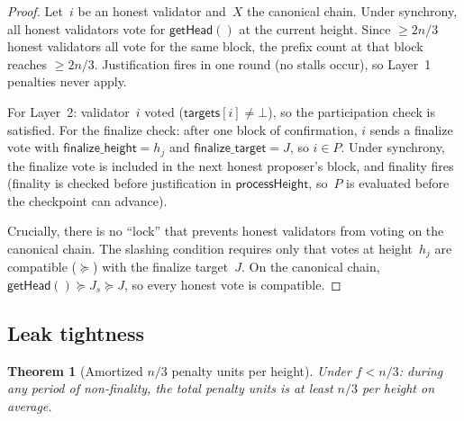 \documentclass{article}
\newcommand{\targets}{\mathsf{targets}}
\newcommand{\finalizetarget}{\mathsf{finalize\_target}}
\newcommand{\finalizeheight}{\mathsf{finalize\_height}}
\theoremstyle{plain}
\newtheorem{theorem}{Theorem}
\theoremstyle{definition}
\theoremstyle{remark}
\begin{document}
\begin{proof}
Let~$i$ be an honest validator and~$X$ the canonical chain.
Under synchrony, all honest validators vote for $\textsf{getHead}()$ at the current height.
Since $\geq 2n/3$ honest validators all vote for the same block, the prefix count at that block reaches $\geq 2n/3$.
Justification fires in one round (no stalls occur), so Layer~1 penalties never apply.

For Layer~2: validator~$i$ voted ($\targets[i] \neq \bot$), so the participation check is satisfied.
For the finalize check: after one block of confirmation, $i$ sends a finalize vote with $\finalizeheight = h_j$ and $\finalizetarget = J$, so $i \in P$.
Under synchrony, the finalize vote is included in the next honest proposer's block, and finality fires (finality is checked before justification in $\textsf{processHeight}$, so~$P$ is evaluated before the checkpoint can advance).

Crucially, there is no ``lock'' that prevents honest validators from voting on the canonical chain.
The slashing condition requires only that votes at height~$h_j$ are compatible ($\succeq$) with the finalize target~$J$.
On the canonical chain, $\textsf{getHead}() \succeq J_s \succeq J$, so every honest vote is compatible.
\end{proof}

\subsection{Leak tightness}

\begin{theorem}[Amortized $n/3$ penalty units per height]\label{thm:tightness}
Under $f < n/3$: during any period of non-finality, the total penalty units is at least $n/3$ per height on average.
\end{theorem}
\end{document}
